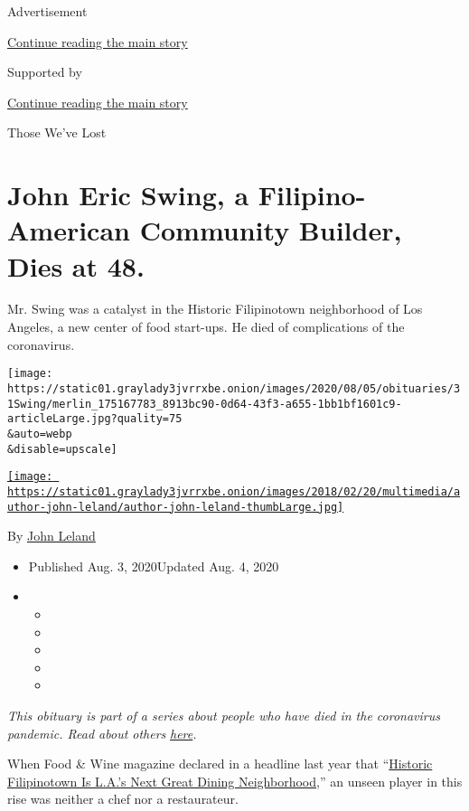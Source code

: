 Advertisement

\protect\hyperlink{after-top}{Continue reading the main story}

Supported by

\protect\hyperlink{after-sponsor}{Continue reading the main story}

Those We've Lost

\hypertarget{john-eric-swing-a-filipino-american-community-builder-dies-at-48}{%
\section{John Eric Swing, a Filipino-American Community Builder, Dies at
48.}\label{john-eric-swing-a-filipino-american-community-builder-dies-at-48}}

Mr. Swing was a catalyst in the Historic Filipinotown neighborhood of
Los Angeles, a new center of food start-ups. He died of complications of
the coronavirus.

\texttt{[image: https://static01.graylady3jvrrxbe.onion/images/2020/08/05/obituaries/31Swing/merlin\_175167783\_8913bc90-0d64-43f3-a655-1bb1bf1601c9-articleLarge.jpg?quality=75\\\&auto=webp\\\&disable=upscale]}

\href{https://www.nytimes3xbfgragh.onion/by/john-leland}{\texttt{[image: https://static01.graylady3jvrrxbe.onion/images/2018/02/20/multimedia/author-john-leland/author-john-leland-thumbLarge.jpg]}}

By \href{https://www.nytimes3xbfgragh.onion/by/john-leland}{John Leland}

\begin{itemize}
\item
  Published Aug. 3, 2020Updated Aug. 4, 2020
\item
  \begin{itemize}
  \item
  \item
  \item
  \item
  \item
  \end{itemize}
\end{itemize}

\emph{This obituary is part of a series about people who have died in
the coronavirus pandemic. Read about others}
\href{https://www.nytimes3xbfgragh.onion/interactive/2020/obituaries/people-died-coronavirus-obituaries.html}{\emph{here}}\emph{.}

When Food \& Wine magazine declared in a headline last year that
``\href{https://www.foodandwine.com/travel/restaurants/historic-filipinotown-restaurants-los-angeles}{Historic
Filipinotown Is L.A.'s Next Great Dining Neighborhood},'' an unseen
player in this rise was neither a chef nor a restaurateur.

